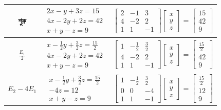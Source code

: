 \begin{center}
\begin{longtable}{|c|c|c|}
\hline
\endlastfoot
শুরু & $\begin{array}{c} 2x -y +3z = 15 \\ 4x -2y +2z = 42 \\ x +y -z = 9 \end{array}$ & $\left[\begin{array}{ccc} 2 & -1 & 3 \\ 4 & -2 & 2 \\ 1 & 1 & -1 \end{array}\right] \left[ \begin{array}{c} x \\ y \\ z \end{array}\right] = \left[ \begin{array}{c} 15 \\ 42 \\ 9 \end{array}\right]$\\[20pt] 
\hline
$\frac{E_1}{2}$ & $\begin{array}{c} x -\frac{1}{2}y +\frac{3}{2}z = \frac{15}{2} \\ 4x -2y +2z = 42 \\ x +y -z = 9 \end{array}$ & $\left[\begin{array}{ccc} 1 & -\frac{1}{2} & \frac{3}{2} \\ 4 & -2 & 2 \\ 1 & 1 & -1 \end{array}\right] \left[ \begin{array}{c} x \\ y \\ z \end{array}\right] = \left[ \begin{array}{c} \frac{15}{2} \\ 42 \\ 9 \end{array}\right]$\\[20pt] 
\hline
$E_2 - 4E_1$ & $\begin{array}{c} x -\frac{1}{2}y +\frac{3}{2}z = \frac{15}{2} \\ -4z = 12 \\ x +y -z = 9 \end{array}$ & $\left[\begin{array}{ccc} 1 & -\frac{1}{2} & \frac{3}{2} \\ 0 & 0 & -4 \\ 1 & 1 & -1 \end{array}\right] \left[ \begin{array}{c} x \\ y \\ z \end{array}\right] = \left[ \begin{array}{c} \frac{15}{2} \\ 12 \\ 9 \end{array}\right]$\\[20pt] 

\end{longtable}
\end{center}
